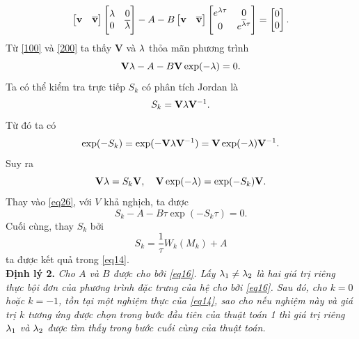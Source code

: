 \begin{equation}\label{200}
	\begin{bmatrix}
		\mathbf{v}&\mathbf{\overline{v}}
	\end{bmatrix}
	\begin{bmatrix}
		\lambda & 0 \\ 0 & \overline{\lambda}
	\end{bmatrix}
	- A - B \begin{bmatrix}
		\mathbf{v}&\mathbf{\overline{v}}
	\end{bmatrix} \begin{bmatrix}
		e^{\lambda\tau} & 0 \\ 0 & e^{\overline{\lambda} \tau}
	\end{bmatrix} = \begin{bmatrix}
		0\\0
	\end{bmatrix}.
\end{equation}
Từ \eqref{100} và \eqref{200} ta thấy $\mathbf{V}$ và $\mathbf{\lambda}$  thỏa mãn phương trình
\begin{equation}\label{eq26}
	\mathbf{V} \mathbf{\lambda} - A - B \mathbf{V} \exp (-\mathbf{\lambda})=0.
\end{equation}
Ta có thể kiểm tra trực tiếp $S_k$ có phân tích Jordan là
\begin{equation}\label{eq27}
	S_k = \mathbf{V} \mathbf{\lambda} \mathbf{V}^{-1}.
\end{equation}
Từ đó ta có
\begin{equation}\label{eq28}
	\exp(-S_k) = \exp (-\mathbf{V} \mathbf{\lambda} \mathbf{V}^{-1}) = \mathbf{V} \exp(-\mathbf{\lambda}) \mathbf{V}^{-1}.
\end{equation}
Suy ra
\begin{equation}\label{eq29}
	\mathbf{V} \mathbf{\lambda} = S_k \mathbf{V}, \quad \mathbf{V} \exp(-\mathbf{\lambda}) = \exp(-S_k) \mathbf{V}.	
\end{equation}
Thay vào \eqref{eq26}, với $V$ khả nghịch, ta được
\begin{equation}\label{eq30}
	S_k -A - B \tau \exp (-S_k \tau) =0 .
\end{equation}
Cuối cùng, thay $S_k$ bởi 
\begin{equation}\label{eq31}
	S_k = \dfrac{1}{\tau}W_k(M_k)+A
\end{equation}
ta được kết quả trong \eqref{eq14}.\\
\noindent\textbf{Định lý 2.} \textit{Cho $A$ và $B$ được cho bởi \eqref{eq16}. Lấy $\lambda_1 \ne \lambda_2$ là hai giá trị riêng thực bội đơn của phương trình đặc trưng của hệ cho bởi \eqref{eq16}. Sau đó, cho $k =0$ hoặc $k =-1$, tồn tại một nghiệm thực của \eqref{eq14}, sao cho nếu nghiệm này và giá trị $k$ tương ứng được chọn trong bước đầu tiên của thuật toán 1 thì giá trị riêng $\lambda_1$ và $\lambda_2$ được tìm thấy trong bước cuối cùng của thuật toán. }\\
